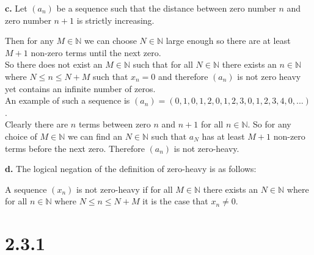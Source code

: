 \documentclass{article}
\begin{document}
{\Large \textbf{c.}} Let $(a_n)$ be a sequence such that the distance between zero number $n$ and zero number $n + 1$ is strictly increasing.
\begin{center}
    \doublespacing
    Then for any $M\in\mathbb{N}$ we can choose $N\in\mathbb{N}$ large enough so there are at least $M + 1$ non-zero terms until the next zero.
    \\So there does not exist an $M\in\mathbb{N}$ such that for all $N\in\mathbb{N}$ there exists an $n\in\mathbb{N}$ where $N\leq n\leq N + M$ such that $x_n = 0$ and therefore $(a_n)$ is not zero heavy yet contains an infinite number of zeros.
    \\An example of such a sequence is $(a_n) = (0, 1, 0, 1, 2, 0, 1, 2, 3, 0, 1, 2, 3, 4, 0, ...)$.
    \\Clearly there are $n$ terms between zero $n$ and $n+1$ for all $n\in\mathbb{N}$. So for any choice of $M\in\mathbb{N}$ we can find an $N\in\mathbb{N}$ such that $a_N$ has at least $M + 1$ non-zero terms before the next zero. Therefore $(a_n)$ is not zero-heavy.
\end{center}

{\Large \textbf{d.}} The logical negation of the definition of zero-heavy is as follows:
\begin{center}
    \doublespacing
    A sequence $(x_n)$ is not zero-heavy if for all $M\in\mathbb{N}$ there exists an $N\in\mathbb{N}$ where for all $n\in\mathbb{N}$ where $N\leq n\leq N + M$ it is the case that $x_n\neq 0$.
\end{center}


\newpage
\section*{2.3.1}
\end{document}
